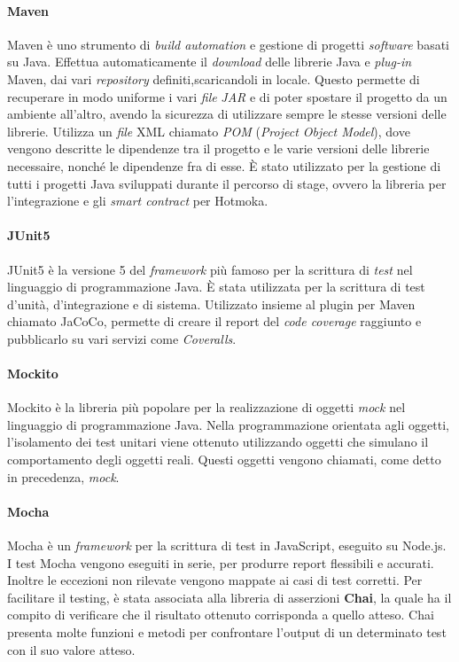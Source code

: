 \paragraph{Maven}
Maven è uno strumento di \textit{build automation} e gestione di progetti \textit{software} basati su Java. Effettua automaticamente il \textit{download} delle librerie Java e \textit{plug-in} Maven, dai vari \textit{repository} definiti,scaricandoli in locale. Questo permette di recuperare in modo uniforme i vari \textit{file} \textit{JAR} e di poter spostare il progetto da un ambiente all'altro, avendo la sicurezza di utilizzare sempre le stesse versioni delle librerie. Utilizza un \textit{file} XML chiamato \textit{POM} (\textit{Project Object Model}), dove vengono descritte le dipendenze tra il progetto e le varie versioni delle librerie necessaire, nonché le dipendenze fra di esse. È stato utilizzato per la gestione di tutti i progetti Java sviluppati durante il percorso di stage, ovvero la libreria per l'integrazione e gli \textit{smart contract} per Hotmoka.

\paragraph{JUnit5}

JUnit5 è la versione 5 del \textit{framework} più famoso per la scrittura di \textit{test} nel linguaggio di programmazione Java. È stata utilizzata per la scrittura di test d'unità, d'integrazione e di sistema. Utilizzato insieme al plugin per Maven chiamato JaCoCo, permette di creare il report del \textit{code coverage} raggiunto e pubblicarlo su vari servizi come \textit{Coveralls}.

\paragraph{Mockito}
Mockito è la libreria più popolare per la realizzazione di oggetti \textit{mock} nel linguaggio di programmazione Java. Nella programmazione orientata agli oggetti, l'isolamento dei test unitari viene ottenuto utilizzando oggetti che simulano il comportamento degli oggetti reali. Questi oggetti vengono chiamati, come detto in precedenza, \textit{mock}.

\paragraph{Mocha}
Mocha è un \textit{framework} per la scrittura di test in JavaScript, eseguito su Node.js. I test Mocha vengono eseguiti in serie, per produrre report flessibili e accurati. Inoltre le eccezioni non rilevate vengono mappate ai casi di test corretti. Per facilitare il testing, è stata associata alla libreria di asserzioni \textbf{Chai}, la quale ha il compito di verificare che il risultato ottenuto corrisponda a quello atteso. Chai presenta molte funzioni e metodi per confrontare l'output di un determinato test con il suo valore atteso.

